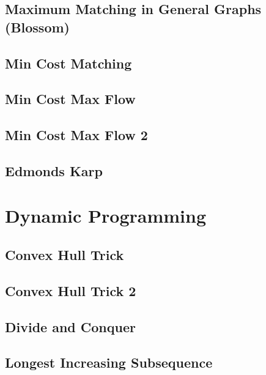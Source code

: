 \subsection{Maximum Matching in General Graphs (Blossom)}
\raggedbottom
\hrulefill
\subsection{Min Cost Matching}
\raggedbottom
\hrulefill
\subsection{Min Cost Max Flow}
\raggedbottom
\hrulefill
\subsection{Min Cost Max Flow 2}
\raggedbottom
\hrulefill
\subsection{Edmonds Karp}
\raggedbottom
\hrulefill

\section{Dynamic Programming}
\subsection{Convex Hull Trick}
\raggedbottom
\hrulefill
\subsection{Convex Hull Trick 2}
\raggedbottom
\hrulefill
\subsection{Divide and Conquer}
\raggedbottom
\hrulefill
\subsection{Longest Increasing Subsequence}
\raggedbottom
\hrulefill

